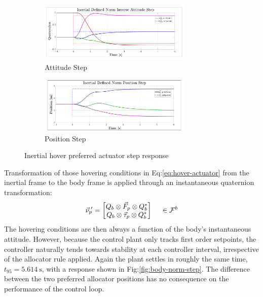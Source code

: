 \begin{figure}[hbtp]
\vspace{-11pt}
\centering
\begin{subfigure}{\textwidth}
\centering
\includegraphics[width=0.8\textwidth]{graphs/inertial_norm_attitude}
\vspace{-12pt}
\caption{Attitude Step}
\label{fig:inertial_norm_attitude}
\end{subfigure}
\begin{subfigure}{\textwidth}
\vspace{-2pt}
\centering
\includegraphics[width=0.8\textwidth]{graphs/inertial_norm_position}
\vspace{-6pt}
\caption{Position Step}
\label{fig:inertia_norm_position}
\vspace{-8pt}
\end{subfigure}
\caption{Inertial hover preferred actuator step response}
\label{fig:inertial-norm-step}
\vspace{-18pt}
\end{figure}
\par
Transformation of those hovering conditions in Eq:\ref{eq:hover-actuator} from the inertial frame to the body frame is applied through an instantaneous quaternion transformation:
\begin{equation}
\vec{\nu}_p\text{}\hspace{-2pt}'=\begin{bmatrix}
Q_b\otimes\vec{F}_p\otimes Q_b^*\\
Q_b\otimes\vec{\tau}_p\otimes Q_b^*
\end{bmatrix}~~~~\in\mathcal{F}^{b}
\end{equation}
The hovering conditions are then always a function of the body's instantaneous attitude. However, because the control plant only tracks first order setpoints, the controller naturally tends towards stability at each controller interval, irrespective of the allocator rule applied. Again the plant settles in roughly the same time, $t_{95}=5.614~\text{s}$, with a response shown in Fig:\ref{fig:body-norm-step}. The difference between the two preferred allocator positions has no consequence on the performance of the control loop.
